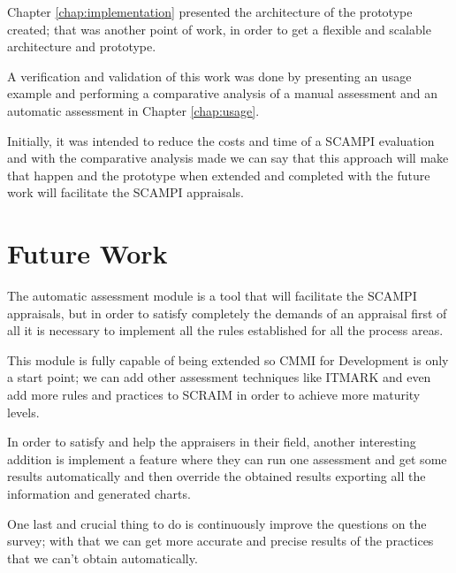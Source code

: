 Chapter \ref{chap:implementation} presented the architecture of the prototype created; that was another point of work, in order to get a flexible and scalable architecture and prototype.

A verification and validation of this work was done by presenting an usage example and performing a comparative analysis of a manual assessment and an automatic assessment in Chapter \ref{chap:usage}. 

Initially, it was intended to reduce the costs and time of a SCAMPI evaluation and with the comparative analysis made we can say that this approach will make that happen and the prototype when extended and completed with the future work will facilitate the SCAMPI appraisals.

\section{Future Work}\label{futurework}

The automatic assessment module is a tool that will facilitate the SCAMPI appraisals, but in order to satisfy completely the demands of an appraisal first of all it is necessary to implement all the rules established for all the process areas.

This module is fully capable of being extended so CMMI for Development is only a start point; we can add other assessment techniques like ITMARK and even add more rules and practices to SCRAIM in order to achieve more maturity levels.

In order to satisfy and help the appraisers in their field, another interesting addition is implement a feature where they can run one assessment and get some results automatically and then override the obtained results exporting all the information and generated charts.

One last and crucial thing to do is continuously improve the questions on the survey; with that we can get more accurate and precise results of the practices that we can't obtain automatically. 